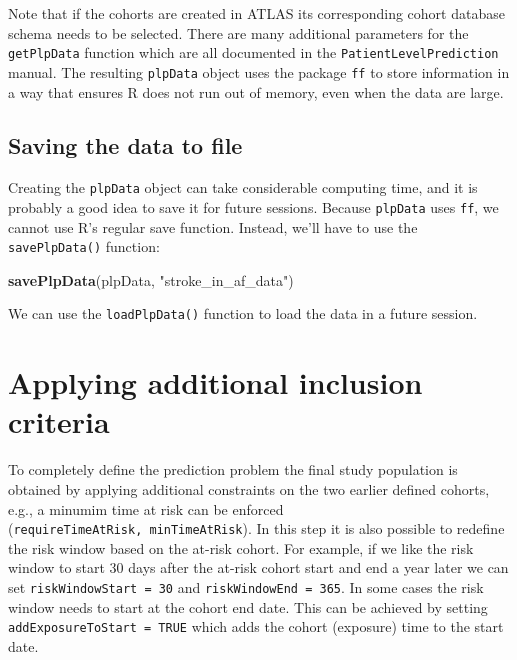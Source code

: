 \documentclass[]{article}
\newenvironment{Shaded}{\begin{snugshade}}{\end{snugshade}}
\newcommand{\KeywordTok}[1]{\textcolor[rgb]{0.13,0.29,0.53}{\textbf{#1}}}
\newcommand{\StringTok}[1]{\textcolor[rgb]{0.31,0.60,0.02}{#1}}
\newcommand{\NormalTok}[1]{#1}
\begin{document}
Note that if the cohorts are created in ATLAS its corresponding cohort
database schema needs to be selected. There are many additional
parameters for the \texttt{getPlpData} function which are all documented
in the \texttt{PatientLevelPrediction} manual. The resulting
\texttt{plpData} object uses the package \texttt{ff} to store
information in a way that ensures R does not run out of memory, even
when the data are large.

\subsection{Saving the data to file}\label{saving-the-data-to-file}

Creating the \texttt{plpData} object can take considerable computing
time, and it is probably a good idea to save it for future sessions.
Because \texttt{plpData} uses \texttt{ff}, we cannot use R's regular
save function. Instead, we'll have to use the \texttt{savePlpData()}
function:

\begin{Shaded}
\begin{Highlighting}[]
\KeywordTok{savePlpData}\NormalTok{(plpData, }\StringTok{"stroke_in_af_data"}\NormalTok{)}
\end{Highlighting}
\end{Shaded}

We can use the \texttt{loadPlpData()} function to load the data in a
future session.

\section{Applying additional inclusion
criteria}\label{applying-additional-inclusion-criteria}

To completely define the prediction problem the final study population
is obtained by applying additional constraints on the two earlier
defined cohorts, e.g., a minumim time at risk can be enforced
(\texttt{requireTimeAtRisk,\ minTimeAtRisk}). In this step it is also
possible to redefine the risk window based on the at-risk cohort. For
example, if we like the risk window to start 30 days after the at-risk
cohort start and end a year later we can set
\texttt{riskWindowStart\ =\ 30} and \texttt{riskWindowEnd\ =\ 365}. In
some cases the risk window needs to start at the cohort end date. This
can be achieved by setting \texttt{addExposureToStart\ =\ TRUE} which
adds the cohort (exposure) time to the start date.
\end{document}
